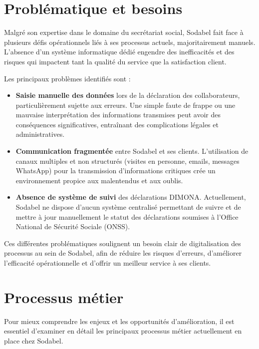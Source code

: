 \section{Problématique et besoins}

Malgré son expertise dans le domaine du secrétariat social, Sodabel fait face à plusieurs défis opérationnels liés à ses processus actuels, majoritairement manuels. L'absence d'un système informatique dédié engendre des inefficacités et des risques qui impactent tant la qualité du service que la satisfaction client.

\noindent Les principaux problèmes identifiés sont :

\begin{itemize}[leftmargin=*,label=\textcolor{darkgray}{$\bullet$},itemsep=0.3em]
  \item \textbf{Saisie manuelle des données} lors de la déclaration des collaborateurs, particulièrement sujette aux erreurs. Une simple faute de frappe ou une mauvaise interprétation des informations transmises peut avoir des conséquences significatives, entraînant des complications légales et administratives.
  
  \item \textbf{Communication fragmentée} entre Sodabel et ses clients. L'utilisation de canaux multiples et non structurés (visites en personne, emails, messages WhatsApp) pour la transmission d'informations critiques crée un environnement propice aux malentendus et aux oublis.
  
  \item \textbf{Absence de système de suivi} des déclarations DIMONA. Actuellement, Sodabel ne dispose d'aucun système centralisé permettant de suivre et de mettre à jour manuellement le statut des déclarations soumises à l'Office National de Sécurité Sociale (ONSS).
\end{itemize}

\noindent Ces différentes problématiques soulignent un besoin clair de digitalisation des processus au sein de Sodabel, afin de réduire les risques d'erreurs, d'améliorer l'efficacité opérationnelle et d'offrir un meilleur service à ses clients.

\section{Processus métier}

Pour mieux comprendre les enjeux et les opportunités d'amélioration, il est essentiel d'examiner en détail les principaux processus métier actuellement en place chez Sodabel.

